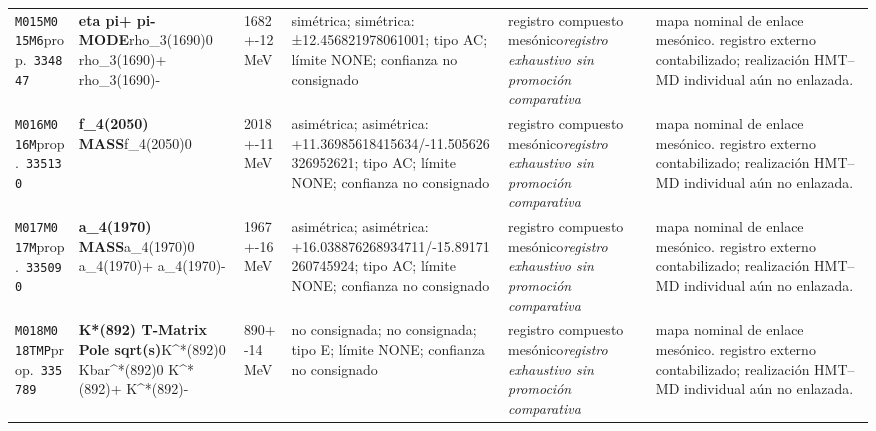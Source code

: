 \begin{landscape}
\begin{longtable}{L{1.85cm}L{4.45cm}L{2.35cm}L{4.05cm}L{3.35cm}L{7.15cm}}
\texttt{M015}\newline \texttt{M015M6}\newline prop.\ \texttt{334847} & \textbf{eta pi+ pi- MODE}\newline rho\_\allowbreak{}3(1690)0 \textbar{}\allowbreak{} rho\_\allowbreak{}3(1690)+ \textbar{}\allowbreak{} rho\_\allowbreak{}3(1690)- & 1682+-12\,MeV & simétrica; simétrica: ±12.456821978061001; tipo AC; límite NONE; confianza no consignado & registro compuesto mesónico\newline \emph{registro exhaustivo sin promoción comparativa} & mapa nominal de enlace mesónico. registro externo contabilizado; realización HMT--MD individual aún no enlazada. \\
\texttt{M016}\newline \texttt{M016M}\newline prop.\ \texttt{335130} & \textbf{f\_\allowbreak{}4(2050) MASS}\newline f\_\allowbreak{}4(2050)0 & 2018+-11\,MeV & asimétrica; asimétrica: +11.36985618415634/-11.505626326952621; tipo AC; límite NONE; confianza no consignado & registro compuesto mesónico\newline \emph{registro exhaustivo sin promoción comparativa} & mapa nominal de enlace mesónico. registro externo contabilizado; realización HMT--MD individual aún no enlazada. \\
\texttt{M017}\newline \texttt{M017M}\newline prop.\ \texttt{335090} & \textbf{a\_\allowbreak{}4(1970) MASS}\newline a\_\allowbreak{}4(1970)0 \textbar{}\allowbreak{} a\_\allowbreak{}4(1970)+ \textbar{}\allowbreak{} a\_\allowbreak{}4(1970)- & 1967+-16\,MeV & asimétrica; asimétrica: +16.038876268934711/-15.89171260745924; tipo AC; límite NONE; confianza no consignado & registro compuesto mesónico\newline \emph{registro exhaustivo sin promoción comparativa} & mapa nominal de enlace mesónico. registro externo contabilizado; realización HMT--MD individual aún no enlazada. \\
\texttt{M018}\newline \texttt{M018TMP}\newline prop.\ \texttt{335789} & \textbf{K*(892) T-Matrix Pole sqrt(s)}\newline K\textasciicircum{}*(892)0 \textbar{}\allowbreak{} Kbar\textasciicircum{}*(892)0 \textbar{}\allowbreak{} K\textasciicircum{}*(892)+ \textbar{}\allowbreak{} K\textasciicircum{}*(892)- & 890+-14\,MeV & no consignada; no consignada; tipo E; límite NONE; confianza no consignado & registro compuesto mesónico\newline \emph{registro exhaustivo sin promoción comparativa} & mapa nominal de enlace mesónico. registro externo contabilizado; realización HMT--MD individual aún no enlazada. \\

\end{longtable}
\end{landscape}
